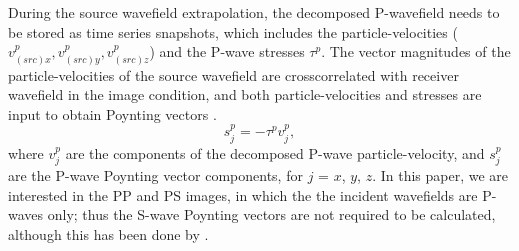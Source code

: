 \documentclass[manuscript,ulem,graphix,revised]{geophysics}
\begin{document}
During the source wavefield extrapolation, the decomposed P-wavefield needs to be stored as time series snapshots, which includes the particle-velocities ($v^p_{(src)x}, v^p_{(src)y},v^p_{(src)z}$) and the P-wave stresses $\tau^p$. The vector magnitudes of the particle-velocities of the source wavefield are crosscorrelated with receiver wavefield in the image condition, and both particle-velocities and stresses are input to obtain Poynting vectors \citep{cerveny01}.%
%
\begin{equation}
s^{p}_j=-\tau^p v^p_j,
\label{eqn:poynting_p}
\end{equation}
where $v^p_j$ are the components of the decomposed P-wave particle-velocity, and $s^{p}_j$ are the P-wave Poynting vector components, for $j$ = $x$, $y$, $z$. In this paper, we are interested in the PP and PS images, in which the the incident wavefields are P-waves only; thus the S-wave Poynting vectors are not required to be calculated, although this has been done by \citet{wenlong_pv16}.
\end{document}
